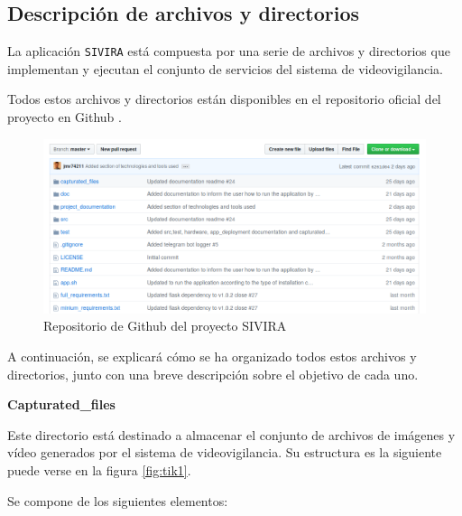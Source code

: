 


\pagestyle{miEstilo506}


\subsection{Descripción de archivos y directorios}

La aplicación \texttt{SIVIRA} está compuesta por una serie de archivos y directorios que implementan y ejecutan el conjunto de servicios del sistema de videovigilancia.

Todos estos archivos y directorios están disponibles en el repositorio oficial del proyecto en Github \cite{ref1}.

\begin{figure}[h]
	\centering
	\includegraphics[scale=0.5]{images/43}
	\caption{Repositorio de Github del proyecto SIVIRA}
\end{figure}

A continuación, se explicará cómo se ha organizado todos estos archivos y directorios, junto con una breve descripción sobre el objetivo de cada uno.

\textbf{Capturated\_files}

Este directorio está destinado a almacenar el conjunto de archivos de imágenes y vídeo generados por el sistema de videovigilancia. Su estructura es la siguiente puede verse en la figura \ref{fig:tik1}.

Se compone de los siguientes elementos:

\vspace{-0.5cm}

